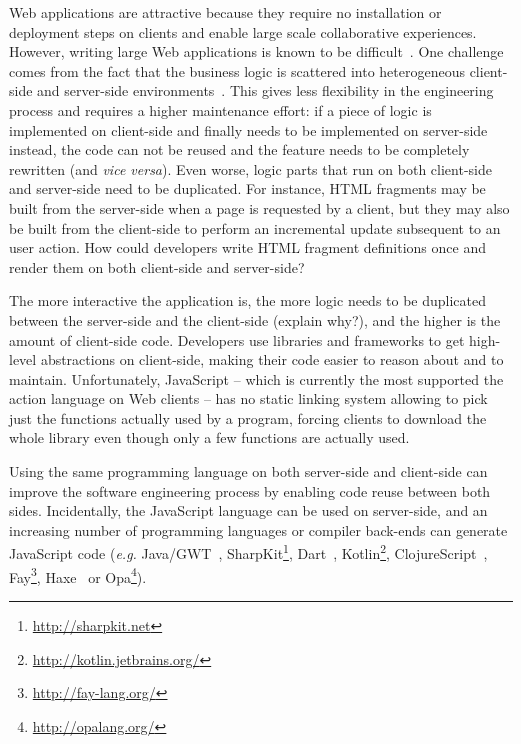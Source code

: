 \documentclass[preprint]{sigplanconf}
\newcommand{\eg}{\emph{e.g.}}
\begin{document}
Web applications are attractive because they require no installation or deployment steps on clients and enable large
scale collaborative experiences. However, writing large Web applications is known to be
difficult~\cite{Mikkonen08_SpaghettiJs,Preciado05_RIAMethodologyNecessity}. One challenge comes from the fact
that the business logic is scattered into heterogeneous client-side and server-side
environments~\cite{Echeverria09_RIA,Kuuskeri09_PartitioningClientServer}. This gives less flexibility in the
engineering process and requires a higher maintenance effort: if a piece of logic is implemented on client-side and
finally needs to be implemented on server-side instead, the code can not be reused and the feature needs to be
completely rewritten (and \emph{vice versa}). Even worse, logic parts that run on both client-side and server-side
need to be duplicated. For instance, HTML fragments may be built from the server-side when a page is requested by a
client, but they may also be built from the client-side to perform an incremental update subsequent to an user
action. How could developers write HTML fragment definitions once and render them on both client-side and
server-side?

The more interactive the application is, the more logic needs to be duplicated between the server-side
and the client-side (explain why?), and the higher is the amount of client-side code. Developers use libraries and
frameworks to get high-level abstractions on client-side, making their code easier to reason about and to
maintain. Unfortunately, JavaScript -- which is currently the most supported the action language on Web clients
-- has no static linking system allowing to pick just the functions actually used by a program, forcing clients to
download the whole library even though only a few functions are actually used.

Using the same programming language on both server-side and client-side can improve the software engineering
process by enabling code reuse between both sides. Incidentally, the JavaScript language can be used on server-side,
and an increasing number of programming languages or compiler back-ends can generate JavaScript code (\eg
Java/GWT~\cite{Chaganti07_GWT}, SharpKit\footnote{\href{http://sharpkit.net}{http://sharpkit.net}},
Dart~\cite{Griffith11_Dart}, Kotlin\footnote{\href{http://kotlin.jetbrains.org/}{http://kotlin.jetbrains.org/}},
ClojureScript~\cite{McGranaghan11_ClojureScript}, Fay\footnote{\href{http://fay-lang.org/}{http://fay-lang.org/}},
Haxe~\cite{Cannasse08_HaXe} or Opa\footnote{\href{http://opalang.org/}{http://opalang.org/}}).
\end{document}
